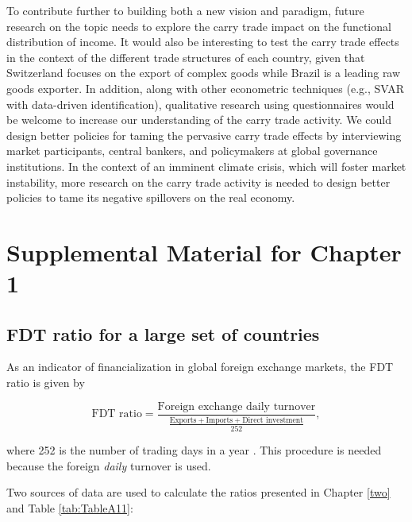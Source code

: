 \documentclass[a4paper, twoside]{templates/ociamthesis}
\begin{document}
To contribute further to building both a new vision and paradigm, future research on the topic needs to explore the carry trade impact on the functional distribution of income. It would also be interesting to test the carry trade effects in the context of the different trade structures of each country, given that Switzerland focuses on the export of complex goods while Brazil is a leading raw goods exporter. In addition, along with other econometric techniques (e.g., SVAR with data-driven identification), qualitative research using questionnaires would be welcome to increase our understanding of the carry trade activity. We could design better policies for taming the pervasive carry trade effects by interviewing market participants, central bankers, and policymakers at global governance institutions. In the context of an imminent climate crisis, which will foster market instability, more research on the carry trade activity is needed to design better policies to tame its negative spillovers on the real economy.

\startappendices

\hypertarget{appendixa}{%
\chapter{Supplemental Material for Chapter 1}\label{appendixa}}

\hypertarget{appendixa1}{%
\section{FDT ratio for a large set of countries}\label{appendixa1}}

As an indicator of financialization in global foreign exchange markets, the FDT ratio is given by

\begin{equation}
\text{FDT ratio} =  \frac{\text{Foreign exchange daily turnover}}{\frac{\text{Exports} + \text{Imports} + \text{Direct investment}}{252}},
\end{equation}

\noindent where 252 is the number of trading days in a year \autocite{newyorkstockexchange2021}. This procedure is needed because the foreign \emph{daily} turnover is used.

Two sources of data are used to calculate the ratios presented in Chapter \ref{two} and Table \ref{tab:TableA11}:
\end{document}
